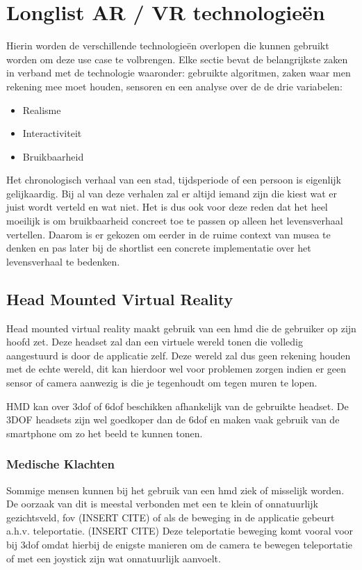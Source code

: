 \chapter{Longlist AR / VR technologieën}
\label{ch:longlist}

Hierin worden de verschillende technologieën overlopen die kunnen gebruikt worden om deze use case te volbrengen.
Elke sectie bevat de belangrijkste zaken in verband met de technologie waaronder: gebruikte algoritmen, zaken waar men rekening mee moet houden, sensoren en een analyse over de de drie variabelen:

\begin{itemize}
    \item Realisme
    \item Interactiviteit
    \item Bruikbaarheid
\end{itemize}

Het chronologisch verhaal van een stad, tijdsperiode of een persoon is eigenlijk gelijkaardig. Bij al van deze verhalen zal er altijd iemand zijn die kiest wat er juist wordt verteld en wat niet. Het is dus ook voor deze reden dat het heel moeilijk is om bruikbaarheid concreet toe te passen op alleen het levensverhaal vertellen. Daarom is er gekozen om eerder in de ruime context van musea te denken en pas later bij de shortlist een concrete implementatie over het levensverhaal te bedenken. 

\section{Head Mounted Virtual Reality}
Head mounted virtual reality maakt gebruik van een \acrshort{hmd} die de gebruiker op zijn hoofd zet. Deze headset zal dan een virtuele wereld tonen die volledig aangestuurd is door de applicatie zelf. Deze wereld zal dus geen rekening houden met de echte wereld, dit kan hierdoor wel voor problemen zorgen indien er geen sensor of camera aanwezig is die je tegenhoudt om tegen muren te lopen.

HMD kan over \acrshort{3dof} of \acrshort{6dof} beschikken afhankelijk van de gebruikte headset. De 3DOF headsets zijn wel goedkoper dan de \acrshort{6dof} en maken vaak gebruik van de smartphone om zo het beeld te kunnen tonen. 
\subsection{Medische Klachten}\label{sec:medical}
Sommige mensen kunnen bij het gebruik van een \acrshort{hmd} ziek of misselijk worden. De oorzaak van dit is meestal verbonden met een te klein of onnatuurlijk gezichtsveld, \acrfull{fov} (INSERT CITE) of als de beweging in de applicatie gebeurt a.h.v. teleportatie. (INSERT CITE) Deze teleportatie beweging komt vooral voor bij \acrshort{3dof} omdat hierbij de enigste manieren om de camera te bewegen teleportatie of met een joystick zijn wat onnatuurlijk aanvoelt.

